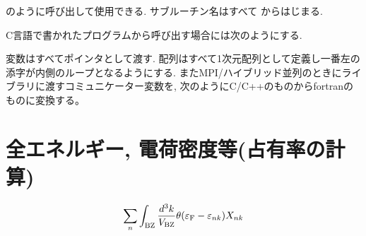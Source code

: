 \documentclass[letterpaper,10pt,dvipdfmx,openany]{sphinxmanual}
\begin{document}
\sphinxAtStartPar
のように呼び出して使用できる.
サブルーチン名はすべて  からはじまる.

\sphinxAtStartPar
C言語で書かれたプログラムから呼び出す場合には次のようにする.

\begin{sphinxVerbatim}[commandchars=\\\{\}]

\end{sphinxVerbatim}

\sphinxAtStartPar
変数はすべてポインタとして渡す.
配列はすべて1次元配列として定義し一番左の添字が内側のループとなるようにする.
またMPI/ハイブリッド並列のときにライブラリに渡すコミュニケーター変数を,
次のようにC/C++のものからfortranのものに変換する。

\begin{sphinxVerbatim}[commandchars=\\\{\}]
\end{sphinxVerbatim}


\section{全エネルギー, 電荷密度等(占有率の計算)}
\label{\detokenize{routine:id2}}\begin{equation*}
\begin{split}\begin{align}
\sum_{n}
\int_{\rm BZ} \frac{d^3 k}{V_{\rm BZ}}
\theta(\varepsilon_{\rm F} -
\varepsilon_{n k}) X_{n k}
\end{align}\end{split}
\end{equation*}
\begin{sphinxVerbatim}[commandchars=\\\{\}]
\end{sphinxVerbatim}
\end{document}
